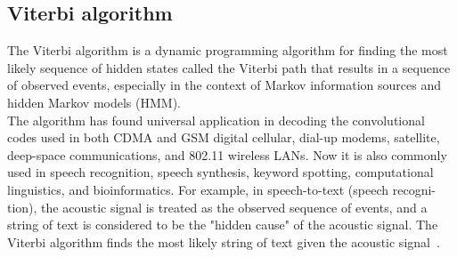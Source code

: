 \subsection{Viterbi algorithm} \label{subsec:viterbi}
The Viterbi algorithm is a dynamic programming algorithm for finding the most likely sequence of hidden states called
the Viterbi path that results in a sequence of observed events, especially in the context of Markov information
sources and hidden Markov models (HMM).\\
The algorithm has found universal application in decoding the convolutional codes used in both CDMA and GSM digital cellular,
dial-up modems, satellite, deep-space communications, and 802.11 wireless LANs.
Now it is also commonly used in speech recognition, speech synthesis, keyword spotting, computational linguistics, and bioinformatics.
For example, in speech-to-text (speech recogni- tion), the acoustic signal is treated as the observed sequence of events, and a string of text is considered
to be the "hidden cause" of the acoustic signal.
The Viterbi algorithm finds the most likely string of text given the acoustic signal~\cite{DBLP:journals/corr/abs-cs-0504020}. \\

